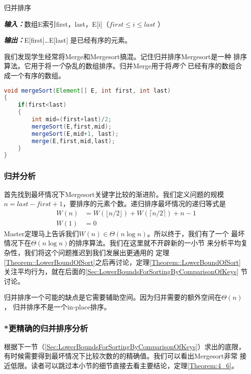 \begin{algorithm}
归并排序

{\textbf{\emph{输入：}}}数组E索引first，last，E[i]（$first\leq i \leq last$ ）

{\textbf{\emph{输出：}}}E[first]…E[last] 是已经有序的元素。
\end{algorithm}

我们发现学生经常将Merge和Mergesort搞混。记住归并排序Mergesort是一种
排序算法。它用于将\emph{一个}杂乱的数组排序。归并Merge用于将\emph{两个}
已经有序的数组合成一个有序的数组。

\begin{lstlisting}[language={Java},keywordstyle=\color{blue!70}, commentstyle=\color{red!50!green!50!blue!50}]
void mergeSort(Element[] E, int first, int last)
{
    if(first<last)
    {
        int mid=(first+last)/2;
        mergeSort(E,first,mid);
        mergeSort(E,mid+1, last);
        merge(E,first,mid,last);
    }
}
\end{lstlisting}

\subsubsection{归并分析}
首先找到最坏情况下Mergesort关键字比较的渐进阶。我们定义问题的规模
$n=last-first+1$，要排序的元素个数。递归排序最坏情况的递归等式是
\begin{equation}\label{Equ:4_5}
\begin{aligned}
W(n)&=W(\lfloor n/2\rfloor)+W(\lceil n/2\rceil)+n-1\\
W(1)&=0
\end{aligned}
\end{equation}
Master定理马上告诉我们$W(n)\in \Theta(n\log n)$。所以终于，我们有了一个
最坏情况下在$\Theta(n\log n)$的排序算法。我们在这里就不开辟新的一小节
来分析平均复杂性，我们将这个问题推迟到我们发展出更通用的
定理\ref{Theorem::LowerBoundOfSort}之后再讨论，定理\ref{Theorem::LowerBoundOfSort}
关注平均行为，就在后面的\ref{Sec:LowerBoundsForSortingByComparisonOfKeys}
节讨论。

归并排序一个可能的缺点是它需要辅助空间。因为归并需要的额外空间在$\Theta(n)$，
归并排序不是一个in-place排序。

\subsubsection{*更精确的归并排序分析}
根据下一节（\ref{Sec:LowerBoundsForSortingByComparisonOfKeys}）求出的底限，
有时候需要得到最坏情况下比较次数的的精确值。我们可以看出Mergesort非常
接近低限。读者可以跳过本小节的细节直接去看主要结论，定理\ref{Theorem:4_6}。

